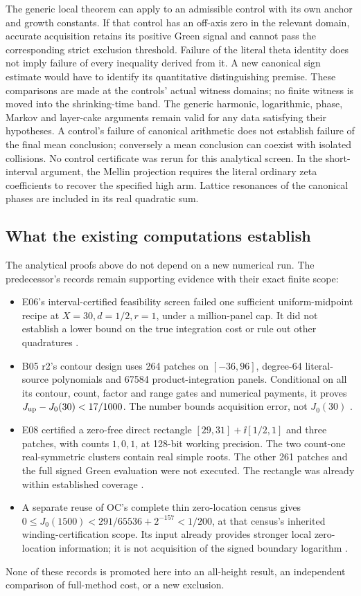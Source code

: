 The generic local theorem can apply to an admissible control with its
own anchor and growth constants. If that control has an off-axis zero
in the relevant domain, accurate acquisition retains its positive
Green signal and cannot pass the corresponding strict exclusion
threshold. Failure of the literal theta identity does not imply
failure of every inequality derived from it. A new canonical sign
estimate would have to identify its quantitative distinguishing
premise.
These comparisons are made at the controls' actual witness domains;
no finite witness is moved into the shrinking-time band. The generic
harmonic, logarithmic, phase, Markov and layer-cake arguments remain
valid for any data satisfying their hypotheses. A control's failure
of canonical arithmetic does not establish failure of the final mean
conclusion; conversely a mean conclusion can coexist with isolated
collisions. No control certificate was rerun for this analytical screen.
In the short-interval argument, the Mellin projection requires the
literal ordinary zeta coefficients to recover the specified high arm.
Lattice resonances of the canonical phases are included in its
real quadratic sum.

\subsection{What the existing computations establish}
The analytical proofs above do not depend on a new numerical run.
The predecessor's records remain supporting evidence with their exact
finite scope:
\begin{itemize}
\item E06's interval-certified feasibility screen failed one sufficient
uniform-midpoint recipe at \(X=30,d=1/2,r=1\), under a million-panel
cap. It did not establish a lower bound on the true integration cost
or rule out other quadratures \cite{OGMidpoint}.
\item B05 r2's contour design uses 264 patches on \([-36,96]\),
degree-64 literal-source polynomials and 67584 product-integration
panels. Conditional on all its contour, count, factor and range gates
and numerical payments, it proves \(J_{\rm up}-J_0(30)<17/1000\).
The number bounds acquisition error, not \(J_0(30)\)
\cite{OGContourDesign}.
\item E08 certified a zero-free direct rectangle
\([29,31]+\ii[1/2,1]\) and three patches, with counts \(1,0,1\), at
128-bit working precision. The two count-one real-symmetric clusters
contain real simple roots. The other 261 patches and the full signed
Green evaluation were not executed. The rectangle was already within
established coverage \cite{OGPilot,OGPilotAssessment}.
\item A separate reuse of OC's complete thin zero-location census gives
\(0\le J_0(1500)<291/65536+2^{-157}<1/200\), at that census's
inherited winding-certification scope. Its input already provides
stronger local zero-location information; it is not acquisition of the
signed boundary logarithm \cite{OGSiblingReuse}.
\end{itemize}
None of these records is promoted here into an all-height result,
an independent comparison of full-method cost, or a new exclusion.

